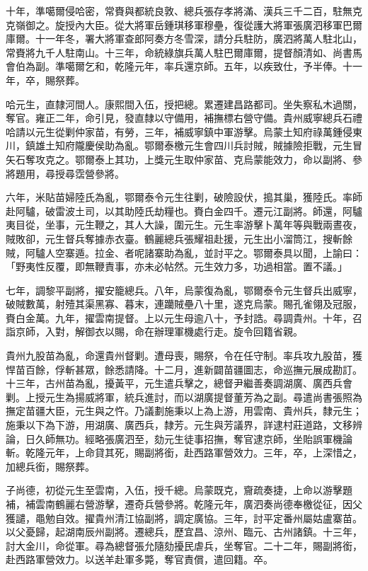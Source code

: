 \begin{pinyinscope}
十年，準噶爾侵哈密，常賚與都統良敦、總兵張存孝將滿、漢兵三千二百，駐無克克嶺御之。旋授內大臣。從大將軍岳鍾琪移軍穆壘，復從護大將軍張廣泗移軍巴爾庫爾。十一年冬，署大將軍查郎阿奏方冬雪深，請分兵駐防，廣泗將萬人駐北山，常賚將九千人駐南山。十三年，命統綠旗兵萬人駐巴爾庫爾，提督顏清如、尚書馬會伯為副。準噶爾乞和，乾隆元年，率兵還京師。五年，以疾致仕，予半俸。十一年，卒，賜祭葬。

哈元生，直隸河間人。康熙間入伍，授把總。累遷建昌路都司。坐失察私木過關，奪官。雍正二年，命引見，發直隸以守備用，補撫標右營守備。貴州威寧總兵石禮哈請以元生從剿仲家苗，有勞，三年，補威寧鎮中軍游擊。烏蒙土知府祿萬鍾侵東川，鎮雄土知府隴慶侯助為亂。鄂爾泰檄元生會四川兵討賊，賊據險拒戰，元生冒矢石奪攻克之。鄂爾泰上其功，上獎元生取仲家苗、克烏蒙能效力，命以副將、參將題用，尋授尋霑營參將。

六年，米貼苗婦陸氏為亂，鄂爾泰令元生往剿，破險設伏，搗其巢，獲陸氏。率師赴阿驢，破雷波土司，以其助陸氏劫糧也。賚白金四千。遷元江副將。師還，阿驢夷目從，坐事，元生鞭之，其人大譟，圍元生。元生率游擊卜萬年等與戰兩晝夜，賊敗卻，元生督兵奪據赤衣臺。鶴麗總兵張耀祖赴援，元生出小溜筒江，搜斬餘賊，阿驢人空寨遁。拉金、者呢諸寨助為亂，並討平之。鄂爾泰具以聞，上諭曰：「野夷性反覆，即無鞭責事，亦未必帖然。元生效力多，功過相當。置不議。」

七年，調黎平副將，擢安籠總兵。八年，烏蒙復為亂，鄂爾泰令元生督兵出威寧，破賊數萬，射殪其渠黑寡、暮末，連躪賊壘八十里，遂克烏蒙。賜孔雀翎及冠服，賚白金萬。九年，擢雲南提督。上以元生母逾八十，予封誥。尋調貴州。十年，召詣京師，入對，解御衣以賜，命在辦理軍機處行走。旋令回籍省親。

貴州九股苗為亂，命還貴州督剿。遭母喪，賜祭，令在任守制。率兵攻九股苗，獲悍苗百餘，俘斬甚眾，餘悉請降。十二月，進新闢苗疆圖志，命巡撫元展成勘訂。十三年，古州苗為亂，擾黃平，元生遣兵擊之，總督尹繼善奏調湖廣、廣西兵會剿。上授元生為揚威將軍，統兵進討，而以湖廣提督董芳為之副。尋遣尚書張照為撫定苗疆大臣，元生與之忤。乃議劃施秉以上為上游，用雲南、貴州兵，隸元生；施秉以下為下游，用湖廣、廣西兵，隸芳。元生與芳議界，詳逮村莊道路，文移辨論，日久師無功。經略張廣泗至，劾元生徒事招撫，奪官逮京師，坐貽誤軍機論斬。乾隆元年，上命貸其死，賜副將銜，赴西路軍營效力。三年，卒，上深惜之，加總兵銜，賜祭葬。

子尚德，初從元生至雲南，入伍，授千總。烏蒙既克，齎疏奏捷，上命以游擊題補，補雲南鶴麗右營游擊，遷奇兵營參將。乾隆元年，廣泗奏尚德奉檄從征，因父獲譴，黽勉自效。擢貴州清江協副將，調定廣協。三年，討平定番州屬姑盧寨苗。以父憂歸，起湖南辰州副將。遷總兵，歷宜昌、涼州、臨元、古州諸鎮。十三年，討大金川，命從軍。尋為總督張允隨劾擾民虐兵，坐奪官。二十二年，賜副將銜，赴西路軍營效力。以送羊赴軍多斃，奪官責償，遣回籍。卒。


\end{pinyinscope}
